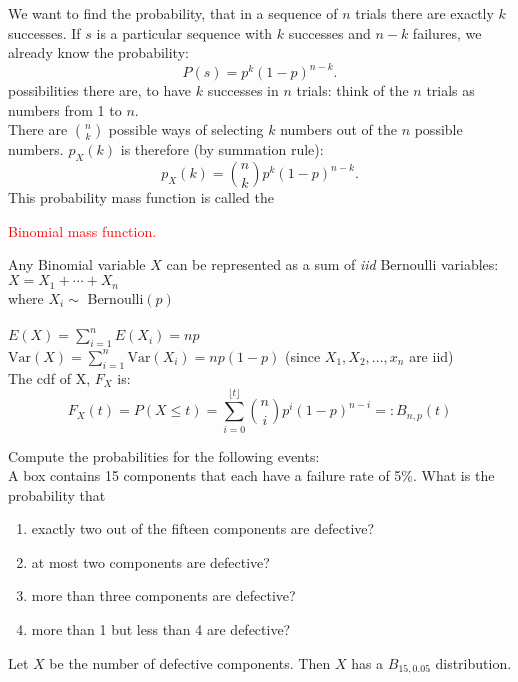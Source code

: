\documentclass[20pt,landscape]{foils}
\newcommand{\no}{\noindent}
\newcommand \h {\hspace*{.3in}}
\newcommand{\bul}{\hspace*{.3in}{\textcolor{red}{$\bullet$ \ }}}
\begin{document}
{{{{{\foilhead[-.8in]{\textcolor{blue}{Derivation of Binomial pmf }}
\no We want to find the probability, that
in a sequence of $n$ trials there are exactly $k$ successes. If $s$ is a
particular sequence with $k$ successes and $n-k$ failures, we
already know the probability:
\[
P(s) = p^{k}(1-p)^{n-k}.
\]
\no  {\textcolor{red}{ Think:} Now we need to know, how
many} possibilities there are, to have $k$ successes in $n$ trials:}
think of the $n$ trials as numbers from 1 to $n$. \\[.1in]
\no There are $n \choose k$ possible ways of selecting $k$  numbers out of the
$n$ possible numbers. $p_{X}(k)$ is therefore (by summation rule):
\[
p_{X}(k) = {n \choose k} p^{k}(1-p)^{n-k}.
\]
This probability mass function is called the  {\textcolor{red}{  Binomial mass
function.}


\foilhead[-.8in]{\textcolor{blue}{Binomial distribution (cont'd)}}
\no  {\textcolor{red} {Remark:}} Any Binomial variable $X$ can be represented as a sum of \emph{iid} Bernoulli variables:\\[.1in]
\no \hspace*{1.5in}$X=X_1+\cdots+X_n$\\[.1in]
\no where $X_i\sim$ Bernoulli$(p)$\\[.1in]
\no   {\textcolor{magenta}{Expected value and Variance of Binomial random variable:}}\\[.1in]
\no \h  \bul $E(X)=\sum\limits_{i=1}^n E(X_i)=np$\\[.1in]
\no \h  \bul $\text{Var}(X)=\sum\limits_{i=1}^n\text{Var}(X_i)=np(1-p)$ (since $X_1, X_2,\ldots,x_n$ are iid)\\[.1in]
\no The cdf of X, $F_{X}$ is:
\[
F_{X}(t) = P(X\leq t)=\sum_{i=0}^{\lfloor{t}\rfloor} {n \choose i} p^{i}(1-p)^{n-i} =:
B_{n,p}(t)
\]


\foilhead[-.8in]{\textcolor{blue}{Binomial distribution: Example}}
\no  {\textcolor{blue} {Example:}} Compute the probabilities for the following events: \\[.1in]
    A box contains 15 components that each have a failure rate of 5\%.
    What is the probability that
    \begin{enumerate}
	\item exactly two out of the fifteen components are defective?
	\item at most two components are defective?
	\item more than three components are defective?
	\item more than 1 but less than 4 are defective?
    \end{enumerate}
 \no   {\textcolor{blue} {Solution:}}   Let $X$ be the number of defective components. Then $X$ has a
    $B_{15,0.05}$ distribution.


}}}}}
\end{document}
